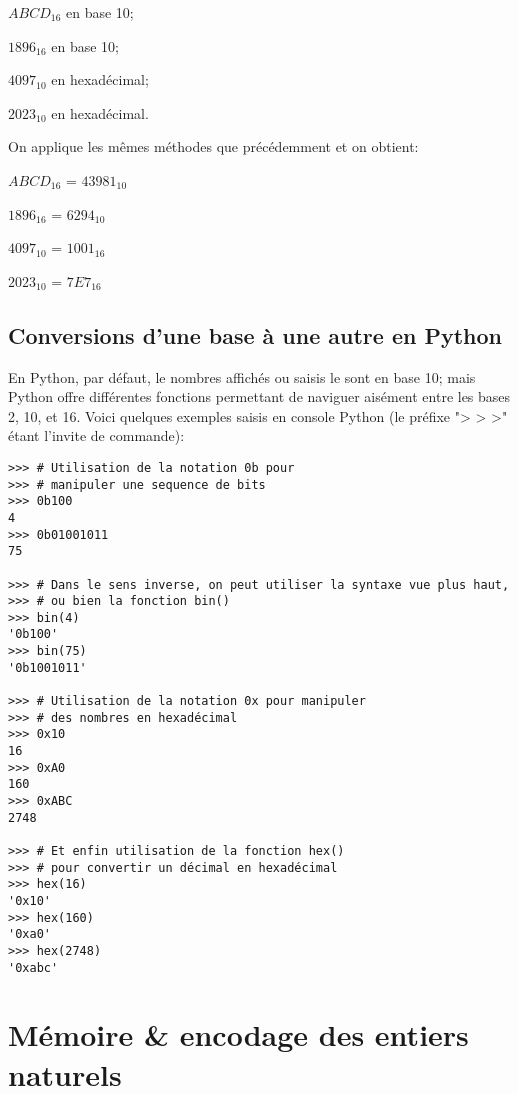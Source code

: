 \documentclass[12pt]{article}
\begin{document}
	 \begin{MonExo}
	 	\begin{alphenum}
	 		\item $ABCD_{16}$ en base 10;
	 		\item $1896_{16}$ en base 10;
	 		\item $4097_{10}$ en hexadécimal;
	 		\item $2023_{10}$ en hexadécimal.
	 	\end{alphenum}
	 \end{MonExo}
	 \begin{MaReponse}
	 	On applique les mêmes méthodes que précédemment et on obtient:
		\begin{alphenum}
			\item $ABCD_{16}$ = $43981_{10}$
			\item $1896_{16}$ = $6294_{10}$
			\item $4097_{10}$ = $1001_{16}$
			\item $2023_{10}$ = $7E7_{16}$
		\end{alphenum}
	\end{MaReponse}
	 
	 \subsection{Conversions d'une base à une autre en Python}
	 En Python, par défaut, le nombres affichés ou saisis le sont en base 10; mais Python offre différentes fonctions permettant de naviguer aisément entre les bases 2, 10, et 16. Voici quelques exemples saisis en console Python (le préfixe "> > >" étant l'invite de commande):
	 \begin{verbatim}
>>> # Utilisation de la notation 0b pour 
>>> # manipuler une sequence de bits
>>> 0b100
4
>>> 0b01001011
75

>>> # Dans le sens inverse, on peut utiliser la syntaxe vue plus haut,
>>> # ou bien la fonction bin()
>>> bin(4)
'0b100'
>>> bin(75)
'0b1001011'

>>> # Utilisation de la notation 0x pour manipuler
>>> # des nombres en hexadécimal
>>> 0x10
16
>>> 0xA0
160
>>> 0xABC
2748

>>> # Et enfin utilisation de la fonction hex() 
>>> # pour convertir un décimal en hexadécimal
>>> hex(16)
'0x10'
>>> hex(160)
'0xa0'
>>> hex(2748)
'0xabc'
	 \end{verbatim}
	 
	 \pagebreak
	 
	 \section{Mémoire \& encodage des entiers naturels}
\end{document}
